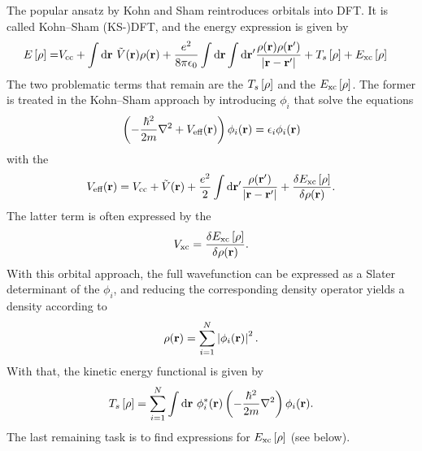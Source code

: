 The popular ansatz by Kohn and Sham reintroduces orbitals into
DFT.\cite{KohnSham1965} It is called Kohn--Sham (KS-)DFT, and the energy
expression is given by
\newcommand\er{\ed{\rho}}
\newcommand\exc{E_{\te{xc}}}
\begin{equation}
\begin{aligned}
 E\ed{\rho}=&\vcc+\indr\ \tilde V(\r) \rho(\r) + \frac
 {e^2}{8\pi\e_0}\indr\indr' \frac {\rho(\r)\rho(\r')}{\abs{\r-\r'}}
 +T_s 	\ed{\rho}+\exc\ed{\rho}
\end{aligned}
\label{Theo:EnergyDensityFunctional}
\end{equation}
The two problematic terms that remain are the  $T_s\er$ and the
 $\exc\er$. The former is treated in the
Kohn--Sham approach by  introducing  $\phi_i$ that solve
the equations \newcommand\veff{V_{\te{eff}}}
\newcommand\hm{\frac{\hbar^2}{2m}}
\begin{equation}
\rb{-\frac{\hbar^2}{2m} \nabla^2 + \veff(\r)} \phi_i(\r) = \eps_i \phi_i(\r)
\label{Theo:SCFDFT}
\end{equation}
with the 
\begin{equation}
\veff(\r)=\vcc+ \tilde V(\r) + \frac {e^2}2 \indr'
\frac{\rho(\r')}{\abs{\r-\r'}}+\delti{\exc\er}{\rho(\r)}.
\label{Theo:Veff}
\end{equation}
The latter term is often expressed by the 
\newcommand\vxc{V_{\te{xc}}}
\begin{equation}
\vxc=\delti{\exc\er}{\rho(\r)}.
\label{Theo:Vxc}
\end{equation}
With this orbital approach, the full wavefunction can be expressed as a Slater determinant of 
the $\phi_i$, and reducing the corresponding density operator yields a density according to
\begin{equation}
\rho(\mathbf{r})=\sum_{i=1}^N \left|{\phi_i(\mathbf{r})}\right|^2.
\label{Theo:RhoByPhi}
\end{equation}
With that, the kinetic energy functional is given by
\begin{equation}
T_s\er=\sum_{i=1}^N \indr\ \phi_i^*(\r) \rb{-\hm \nabla^2} \phi_i(\r).
\end{equation}
The last remaining task is to find expressions for $\exc\er$ (see below).

